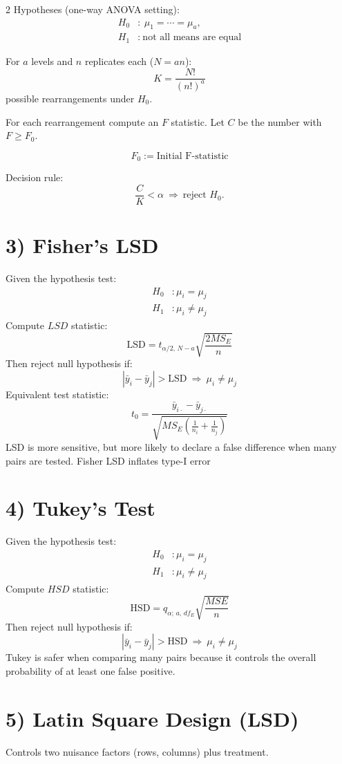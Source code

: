 \documentclass[10pt, letterpaper]{article}
\begin{document}
\begin{multicols}{2}
Hypotheses (one-way ANOVA setting):
\begin{align*}
H_0&:\ \mu_1=\cdots=\mu_a, \\
H_1&:\ \text{not all means are equal}
\end{align*}

For $a$ levels and $n$ replicates each ($N=an$):
\[
K=\frac{N!}{(n!)^a}
\]
possible rearrangements under $H_0$.

For each rearrangement compute an $F$ statistic. Let $C$ be the number with $F\ge F_0$.

\[
F_0 := \text{Initial F-statistic}
\]

Decision rule:
\[
\frac{C}{K}<\alpha\ \Rightarrow\ \text{reject }H_0.
\]

\section*{3) Fisher's LSD}
Given the hypothesis test:
\begin{align*}
    H_0&: \mu_i=\mu_j\\
    H_1&:\mu_i \neq \mu_j
\end{align*}
Compute $LSD$ statistic:
\[
\mathrm{LSD}=t_{\alpha/2,\,N- a}\sqrt{\frac{2MS_E}{n}}
\]
Then reject null hypothesis if:
\[
|\bar y_i-\bar y_j|>\mathrm{LSD}\ \Rightarrow\ \mu_i\neq\mu_j
\]
Equivalent test statistic:
\[
t_0=\frac{\bar y_{i\cdot}-\bar y_{j\cdot}}{\sqrt{MS_E\left(\frac1{n_i}+\frac1{n_j}\right)}}
\]
LSD is more sensitive, but more likely to declare a false difference when many pairs are tested.
Fisher LSD inflates type-I error
\section*{4) Tukey's Test}
Given the hypothesis test:
\begin{align*}
    H_0&: \mu_i=\mu_j\\
    H_1&:\mu_i \neq \mu_j
\end{align*}
Compute $HSD$ statistic:
\[
\mathrm{HSD}=q_{\alpha;\,a,\,df_E}\sqrt{\frac{MSE}{n}}
\]
Then reject null hypothesis if:
\[
|\bar y_i-\bar y_j|>\mathrm{HSD}\ \Rightarrow\ \mu_i\neq\mu_j
\]
Tukey is safer when comparing many pairs because it controls the overall probability of at least one false positive.


\section*{5) Latin Square Design (LSD)}
Controls two nuisance factors (rows, columns) plus treatment.


\end{multicols}
\end{document}
